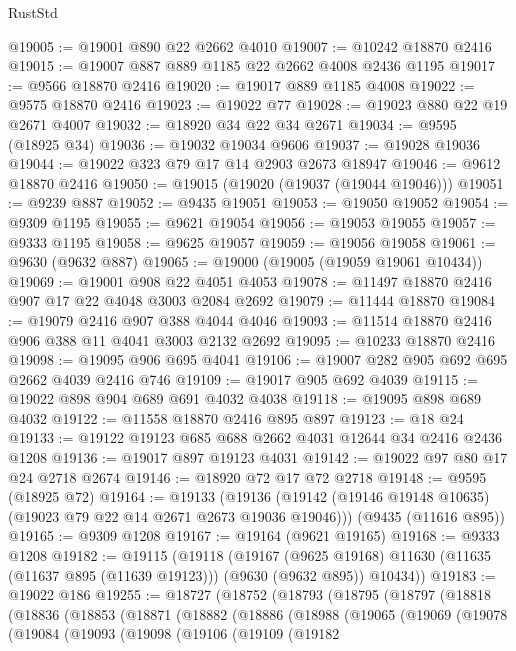 \begin{lexlean}{RustStd}
\begin{coremodule}
@19005 := @19001 @890 @22 @2662 @4010
@19007 := @10242 @18870 @2416
@19015 := @19007 @887 @889 @1185 @22 @2662 @4008 @2436 @1195
@19017 := @9566 @18870 @2416
@19020 := @19017 @889 @1185 @4008
@19022 := @9575 @18870 @2416
@19023 := @19022 @77
@19028 := @19023 @880 @22 @19 @2671 @4007
@19032 := @18920 @34 @22 @34 @2671
@19034 := @9595 (@18925 @34)
@19036 := @19032 @19034 @9606
@19037 := @19028 @19036
@19044 := @19022 @323 @79 @17 @14 @2903 @2673 @18947
@19046 := @9612 @18870 @2416
@19050 := @19015 (@19020 (@19037 (@19044 @19046)))
@19051 := @9239 @887
@19052 := @9435 @19051
@19053 := @19050 @19052
@19054 := @9309 @1195
@19055 := @9621 @19054
@19056 := @19053 @19055
@19057 := @9333 @1195
@19058 := @9625 @19057
@19059 := @19056 @19058
@19061 := @9630 (@9632 @887)
@19065 := @19000 (@19005 (@19059 @19061 @10434))
@19069 := @19001 @908 @22 @4051 @4053
@19078 := @11497 @18870 @2416 @907 @17 @22 @4048 @3003 @2084 @2692
@19079 := @11444 @18870
@19084 := @19079 @2416 @907 @388 @4044 @4046
@19093 := @11514 @18870 @2416 @906 @388 @11 @4041 @3003 @2132 @2692
@19095 := @10233 @18870 @2416
@19098 := @19095 @906 @695 @4041
@19106 := @19007 @282 @905 @692 @695 @2662 @4039 @2416 @746
@19109 := @19017 @905 @692 @4039
@19115 := @19022 @898 @904 @689 @691 @4032 @4038
@19118 := @19095 @898 @689 @4032
@19122 := @11558 @18870 @2416 @895 @897
@19123 := @18 @24
@19133 := @19122 @19123 @685 @688 @2662 @4031 @12644 @34 @2416 @2436 @1208
@19136 := @19017 @897 @19123 @4031
@19142 := @19022 @97 @80 @17 @24 @2718 @2674
@19146 := @18920 @72 @17 @72 @2718
@19148 := @9595 (@18925 @72)
@19164 := @19133
    (@19136 (@19142 (@19146 @19148 @10635) (@19023 @79 @22 @14 @2671 @2673 @19036 @19046)))
    (@9435 (@11616 @895))
@19165 := @9309 @1208
@19167 := @19164 (@9621 @19165)
@19168 := @9333 @1208
@19182 := @19115
    (@19118
      (@19167
        (@9625 @19168)
        @11630
        (@11635 (@11637 @895 (@11639 @19123)))
        (@9630 (@9632 @895))
        @10434))
@19183 := @19022 @186
@19255 := @18727
    (@18752
      (@18793
        (@18795
          (@18797
            (@18818
              (@18836
                (@18853
                  (@18871
                    (@18882
                      (@18886
                        (@18988
                          (@19065
                            (@19069
                              (@19078
                                (@19084
                                  (@19093
                                    (@19098
                                      (@19106
                                        (@19109
                                          (@19182

\end{coremodule}
\end{lexlean}
